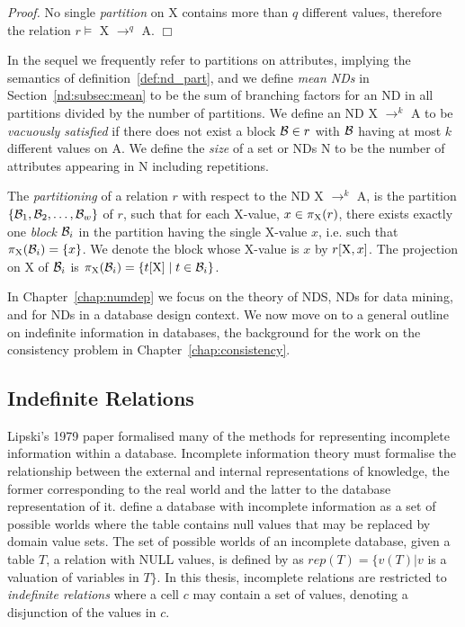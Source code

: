 {\em Proof.} No single {\em partition} on X contains more than $q$
different values, therefore the relation $r \models$ X $\to^q$ A. $\Box$

\medskip

In the sequel we frequently refer to partitions on attributes,
implying the semantics of definition~\ref{def:nd_part}, and we define {\em mean
NDs} in Section~\ref{nd:subsec:mean} to be the sum of branching
factors for an ND in all partitions divided by the number of
partitions. We define an ND X $\to^k$ A to be 
{\em vacuously satisfied} if there does not exist a block ${\cal B}
\in r$ with ${\cal B}$ having at most $k$ different values on A.
We define the {\em size} of a set or NDs N to be the number of attributes 
appearing in N including repetitions.
\begin{definition}\label{def:nd_part}
\begin{rm}
The {\em partitioning} of a relation $r$ with respect to the ND 
X $\to^k$ A, is the partition $\{{\cal B}_1, {\cal B}_2, \ldots, {\cal B}_w\}$
of $r$, such that for each X-value, $x \in \pi_{\rm X}(r)$, 
there exists exactly one {\em block} ${\cal B}_i$ in the partition 
having the single X-value $x$, i.e. such that $\pi_{\rm X}({\cal B}_i)
= \{x\}$. 
We denote the block whose X-value is $x$ by $r[{\rm X}, x]$.
The projection on X of ${\cal B}_i$ is $\pi_{\rm X}({\cal B}_i) = \{
t[{\rm X}] \mid t \in {\cal B}_i \}$. 
\end{rm}
\end{definition}

\medskip

In Chapter~\ref{chap:numdep} we focus on the theory of NDS, NDs for
data mining, and for NDs in a database design context. We now move on
to a general outline on indefinite information in databases, the
background for the work on the consistency problem in Chapter~\ref{chap:consistency}.

\subsection{Indefinite Relations}\label{subsec:rev_indef}

Lipski's 1979 paper \cite{lip79} formalised many of the methods for 
representing incomplete information within a database.  Incomplete
information theory must formalise the relationship between the external
and internal representations of knowledge, the former corresponding to
the real world and the latter to the database representation of it.
\cite{databasefound} define a database with incomplete information as a set
of possible worlds where the table contains null values that may be replaced
by domain value sets. The set of possible worlds of an incomplete
database, given a table $T$, a 
relation with NULL values, is
defined by \cite{databasefound}
as $rep(T) = \{v(T) |  v$  is a valuation of variables in  $T
\}$. In this thesis, incomplete relations are restricted to {\em
indefinite relations} where a cell $c$ may 
contain a set of values, denoting a disjunction of the values in
$c$. \\


